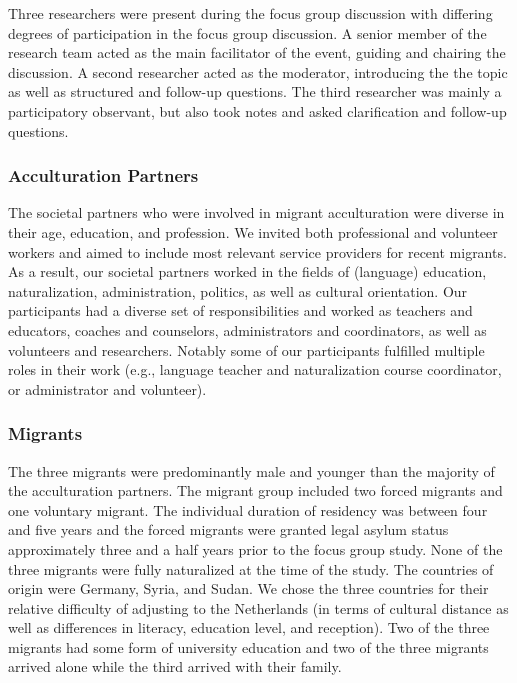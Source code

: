 \documentclass[man, 12pt, a4paper]{apa7}
\begin{document}
Three researchers were present during the focus group discussion with differing degrees of participation in the focus group discussion. A senior member of the research team acted as the main facilitator of the event, guiding and chairing the discussion. A second researcher acted as the moderator, introducing the the topic as well as structured and follow-up questions. The third researcher was mainly a participatory observant, but also took notes and asked clarification and follow-up questions.

\subsubsection{Acculturation Partners}

The societal partners who were involved in migrant acculturation were diverse in their age, education, and profession. We invited both professional and volunteer workers and aimed to include most relevant service providers for recent migrants. As a result, our societal partners worked in the fields of (language) education, naturalization, administration, politics, as well as cultural orientation. Our participants had a diverse set of responsibilities and worked as teachers and educators, coaches and counselors, administrators and coordinators, as well as volunteers and researchers. Notably some of our participants fulfilled multiple roles in their work (e.g., language teacher and naturalization course coordinator, or administrator and volunteer).

\subsubsection{Migrants}

The three migrants were predominantly male and younger than the majority of the acculturation partners. The migrant group included two forced migrants and one voluntary migrant. The individual duration of residency was between four and five years and the forced migrants were granted legal asylum status approximately three and a half years prior to the focus group study. None of the three migrants were fully naturalized at the time of the study. The countries of origin were Germany, Syria, and Sudan. We chose the three countries for their relative difficulty of adjusting to the Netherlands (in terms of cultural distance as well as differences in literacy, education level, and reception). Two of the three migrants had some form of university education and two of the three migrants arrived alone while the third arrived with their family. 
\end{document}
